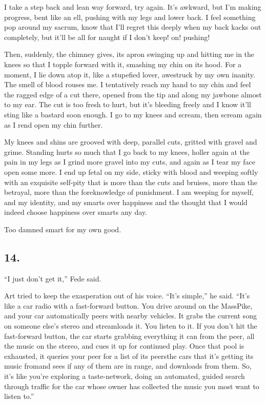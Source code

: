 I take a step back and lean way forward, try again. It’s awkward,
but I’m making progress, bent like an ell, pushing with my legs and
lower back. I feel something pop around my sacrum, know that I’ll
regret this deeply when my back kacks out completely, but it’ll be
all for naught if I don’t keep! on! pushing!

Then, suddenly, the chimney gives, its apron swinging up and
hitting me in the knees so that I topple forward with it, smashing
my chin on its hood. For a moment, I lie down atop it, like a
stupefied lover, awestruck by my own inanity. The smell of blood
rouses me. I tentatively reach my hand to my chin and feel the
ragged edge of a cut there, opened from the tip and along my
jawbone almost to my ear. The cut is too fresh to hurt, but it’s
bleeding freely and I know it’ll sting like a bastard soon enough.
I go to my knees and scream, then scream again as I rend open my
chin further.

My knees and shins are grooved with deep, parallel cuts, gritted
with gravel and grime. Standing hurts so much that I go back to my
knees, holler again at the pain in my legs as I grind more gravel
into my cuts, and again as I tear my face open some more. I end up
fetal on my side, sticky with blood and weeping softly with an
exquisite self-pity that is more than the cuts and bruises, more
than the betrayal, more than the foreknowledge of punishment. I am
weeping for myself, and my identity, and my smarts over happiness
and the thought that I would indeed choose happiness over smarts
any day.

Too damned smart for my own good.

\subsection{14.}

“I just don’t get it,” Fede said.

Art tried to keep the exasperation out of his voice. “It’s simple,”
he said. “It’s like a car radio with a fast-forward button. You
drive around on the MassPike, and your car automatically peers with
nearby vehicles. It grabs the current song on someone else’s stereo
and streamloads it. You listen to it. If you don’t hit the
fast-forward button, the car starts grabbing everything it can from
the peer, all the music on the stereo, and cues it up for continued
play. Once that pool is exhausted, it queries your peer for a list
of its peers{\dash}the cars that it’s getting its music from{\dash}and sees if
any of them are in range, and downloads from them. So, it’s like
you’re exploring a taste-network, doing an automated, guided search
through traffic for the car whose owner has collected the music you
most want to listen to.”


